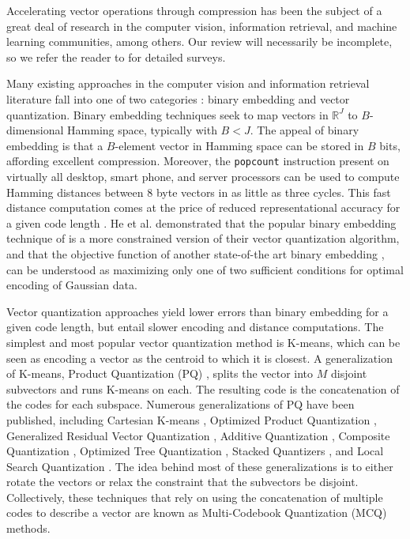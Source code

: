 
Accelerating vector operations through compression has been the subject of a great deal of research in the computer vision, information retrieval, and machine learning communities, among others. Our review will necessarily be incomplete, so we refer the reader to \cite{learningToHashSurvey, hashingSimilaritySurvey} for detailed surveys. %

Many existing approaches in the computer vision and information retrieval literature fall into one of two categories \cite{hashingSimilaritySurvey}: binary embedding and vector quantization. Binary embedding techniques seek to map vectors in $\mathbb{R}^J$ to $B$-dimensional Hamming space, typically with $B < J$. The appeal of binary embedding is that a $B$-element vector in Hamming space can be stored in $B$ bits, affording excellent compression. Moreover, the \texttt{popcount} instruction present on virtually all desktop, smart phone, and server processors can be used to compute Hamming distances between 8 byte vectors in as little as three cycles. This fast distance computation comes at the price of reduced representational accuracy for a given code length \cite{opq,hashingSimilaritySurvey} . He et al. \cite{opq} demonstrated that the popular binary embedding technique of \cite{ITQ} is a more constrained version of their vector quantization algorithm, and that the objective function of another state-of-the art binary embedding \cite{isohash}, can be understood as maximizing only one of two sufficient conditions for optimal encoding of Gaussian data.

Vector quantization approaches yield lower errors than binary embedding for a given code length, but entail slower encoding and distance computations. The simplest and most popular vector quantization method is K-means, which can be seen as encoding a vector as the centroid to which it is closest. A generalization of K-means, Product Quantization (PQ) \cite{pq}, splits the vector into $M$ disjoint subvectors and runs K-means on each. The resulting code is the concatenation of the codes for each subspace. Numerous generalizations of PQ have been published, including Cartesian K-means \cite{cartesianKmeans}, Optimized Product Quantization \cite{opq},  Generalized Residual Vector Quantization \cite{grvq}, Additive Quantization \cite{aq}, Composite Quantization \cite{cq}, Optimized Tree Quantization \cite{otq}, Stacked Quantizers \cite{stackedQuantizers}, and Local Search Quantization \cite{lsq}. The idea behind most of these generalizations is to either rotate the vectors or relax the constraint that the subvectors be disjoint. Collectively, these techniques that rely on using the concatenation of multiple codes to describe a vector are known as Multi-Codebook Quantization (MCQ) methods. %

